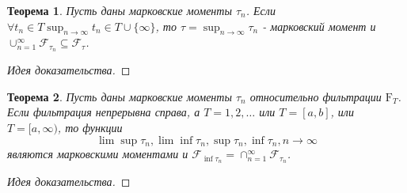 \documentclass[16pt]{article}
\newtheorem{theorem}{Теорема}[section]
\theoremstyle{definition}
\begin{document}
\begin{theorem}
Пусть даны марковские моменты $\tau_n$. Если $\forall t_n \in T \sup_{n \rightarrow \infty}t_n \in T \cup \{\infty\}$, то $\tau = \sup_{n \rightarrow \infty}\tau_n$ - марковский момент и $\cup_{n = 1}^\infty \mathcal{F}_{\tau_n} \subseteq \mathcal{F}_\tau$.
\end{theorem}
\begin{proof}[Идея доказательства]

\end{proof}
\begin{theorem}
Пусть даны марковские моменты $\tau_n$ относительно фильтрации $\mathrm{F}_T$. Если фильтрация непрерывна справа, а $T = {1, 2, \ldots}$ или $T = [a, b]$, или $T = [a, \infty)$, то функции $$\lim\sup \tau_n, \lim\inf \tau_n, \sup \tau_n, \inf \tau_n, n \rightarrow \infty$$ являются марковскими моментами и $\mathcal{F}_{\inf \tau_n} = \cap_{n = 1}^\infty \mathcal{F}_{\tau_n}$.
\end{theorem}
\begin{proof}[Идея доказательства]

\end{proof}
\end{document}
